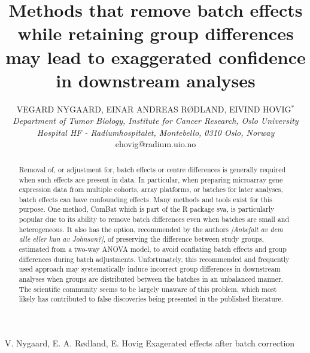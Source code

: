 \documentclass{bio}
\newcommand\NB[1]{\textcolor{NBcol}{\textit{#1}}} %
\newcommand\NOTE[1]{\NB{[#1]}} %
\providecommand{\DIFdeltex}[1]{{\protect\color{red}\sout{#1}}}                      %
\providecommand{\DIFaddbegin}{} %
\providecommand{\DIFaddend}{} %
\providecommand{\DIFdelbegin}{} %
\providecommand{\DIFdelend}{} %
\providecommand{\DIFdel}[1]{\texorpdfstring{\DIFdeltex{#1}}{}} %
\begin{document}
\footnotetext{\color{blue}Manuscript version \DIFdelbegin \DIFdel{22 April 2014}\DIFdelend \DIFaddbegin \today\DIFaddend }

\title{Methods that remove batch effects while retaining group differences may lead
to exaggerated confidence in downstream analyses
}

\author{VEGARD NYGAARD, EINAR ANDREAS RØDLAND, EIVIND HOVIG$^\ast$\\[4pt]
\textit{Department of Tumor Biology,
Institute for Cancer Research,
Oslo University Hospital HF - Radiumhospitalet,
Montebello,
0310 Oslo,
Norway}
\\[2pt]
{ehovig@radium.uio.no}}

\markboth%
{V. Nygaard, E. A. Rødland, E. Hovig}
{Exagerated effects after batch correction}


\maketitle


\begin{abstract}
{Removal of, or adjustment for, batch effects or centre differences is generally required when such effects are present in data. In particular, when preparing microarray gene expression data from multiple cohorts, array platforms, or batches for later analyses, batch effects can have confounding effects. Many methods and tools exist for this purpose. One method, ComBat which is part of the R package sva, is particularly popular due to its ability to remove batch differences even when batches are small and heterogeneous. It also has the option, recommended by the authors \NOTE{Anbefalt av dem alle eller kun av Johnson?}, of preserving the difference between study groups, estimated from a two-way ANOVA model, to avoid conflating batch effects and group differences during batch adjustments. Unfortunately, this recommended and frequently used approach may systematically induce incorrect group differences in downstream analyses when groups are distributed between the batches in an unbalanced manner. The scientific community seems to be largely unaware of this problem, which most likely has contributed to false discoveries being presented in the published literature.
}
\end{abstract}
\end{document}
